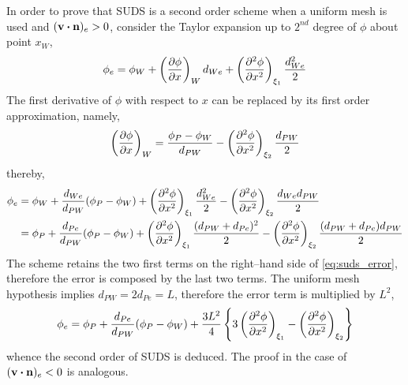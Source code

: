 In order to prove that SUDS is a second order scheme when a uniform mesh
is used and $(\vb{v} \vdot \vb{n})_e > 0$, consider the Taylor expansion up to
$2^{nd}$ degree of $\phi$ about point $x_W$,
\begin{equation}
	\phi_e = 
	\phi_W + 
	\left( \pdv{\phi}{x} \right)_W d_{We} + 
	\left( \pdv[2]{\phi}{x} \right)_{\xi_1} \frac{d_{We}^2}{2}
\end{equation}
The first derivative of $\phi$ with respect to $x$ can be replaced by its first
order approximation, namely,
\begin{equation}
	\left(\pdv{\phi}{x}\right)_W = 
	\frac{\phi_P - \phi_W}{d_{PW}} - \left(\pdv[2]{\phi}{x}\right)_{\xi_2} \frac{d_{PW}}{2}
\end{equation}
thereby,
\begin{align}
	\phi_e 
	&= 
	\phi_W + 
	\frac{d_{We}}{d_{PW}} (\phi_P - \phi_W) + 
	\left( \pdv[2]{\phi}{x} \right)_{\xi_1} \frac{d_{We}^2}{2} - 
	\left( \pdv[2]{\phi}{x} \right)_{\xi_2} \frac{d_{We} d_{PW}}{2} \nonumber \\
	&= 
	\phi_P + 
	\frac{d_{Pe}}{d_{PW}} (\phi_P - \phi_W) + 
	\left( \pdv[2]{\phi}{x} \right)_{\xi_1} \frac{(d_{PW} + d_{Pe})^2}{2} - 
	\left( \pdv[2]{\phi}{x} \right)_{\xi_2} \frac{(d_{PW} + d_{Pe}) d_{PW}}{2}	
	\label{eq:suds_error}
\end{align}
The scheme retains the two first terms on the right--hand side of
\eqref{eq:suds_error}, therefore the error is composed by the last two terms.
The uniform mesh hypothesis implies $d_{PW} = 2 d_{Pe} = L$, therefore the error
term is multiplied by $L^2$,
\begin{equation}
	\phi_e = 
	\phi_P + \frac{d_{Pe}}{d_{PW}} (\phi_P - \phi_W) + 
	\frac{3 L^2}{4}
	\left\{
	3 \left( \pdv[2]{\phi}{x} \right)_{\xi_1} - \left( \pdv[2]{\phi}{x} \right)_{\xi_2}
	\right\}
\end{equation}
whence the second order of SUDS is deduced. The proof in the case of $(\vb{v}
\vdot \vb{n})_e < 0$ is analogous.